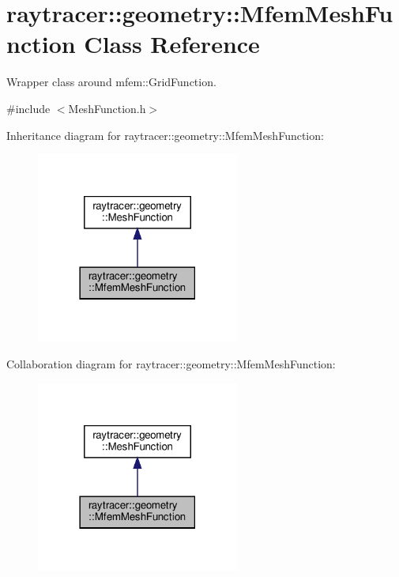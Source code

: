 \hypertarget{classraytracer_1_1geometry_1_1MfemMeshFunction}{}\section{raytracer\+:\+:geometry\+:\+:Mfem\+Mesh\+Function Class Reference}
\label{classraytracer_1_1geometry_1_1MfemMeshFunction}


Wrapper class around mfem\+::\+Grid\+Function.  




{\ttfamily \#include $<$Mesh\+Function.\+h$>$}



Inheritance diagram for raytracer\+:\+:geometry\+:\+:Mfem\+Mesh\+Function\+:\nopagebreak
\begin{figure}[H]
\begin{center}
\leavevmode
\includegraphics[width=189pt]{classraytracer_1_1geometry_1_1MfemMeshFunction__inherit__graph}
\end{center}
\end{figure}


Collaboration diagram for raytracer\+:\+:geometry\+:\+:Mfem\+Mesh\+Function\+:\nopagebreak
\begin{figure}[H]
\begin{center}
\leavevmode
\includegraphics[width=189pt]{classraytracer_1_1geometry_1_1MfemMeshFunction__coll__graph}
\end{center}
\end{figure}
